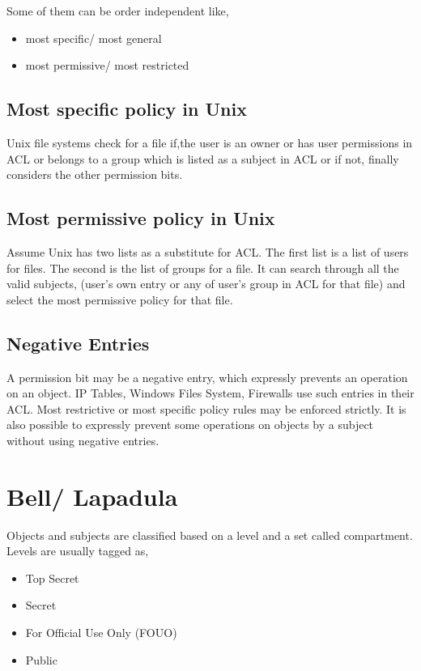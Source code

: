 \documentclass[11pt]{article} %
\begin{document}
Some of them can be order independent like,
\begin{itemize} \itemsep -2pt  %
\item most specific/ most general
\item most permissive/ most restricted
\end{itemize}

\subsection{Most specific policy in Unix}
Unix file systems check for a file if,the user is an owner or has user permissions in ACL
or belongs to a group which is listed as a subject in ACL or if not, finally considers the
other permission bits.

\subsection{Most permissive policy in Unix}
Assume Unix has two lists as a substitute for ACL. The first list is a list of users for
files. The second is the list of groups for a file. It can search through all the valid
subjects, (user's own entry or any of user's group in ACL for that file) and select the
most permissive policy for that file.

\subsection{Negative Entries}
A permission bit may be a negative entry, which expressly prevents an operation on an
object. IP Tables, Windows Files System, Firewalls use such entries in their ACL. Most
restrictive or most specific policy rules may be enforced strictly. It is also possible
to expressly prevent some operations on objects by a subject without using negative entries.

\section{Bell/ Lapadula}
Objects and subjects are classified based on a level and a set called compartment. Levels
are usually tagged as,

\begin{itemize} \itemsep -2pt  %
\item Top Secret
\item Secret
\item For Official Use Only (FOUO)
\item Public
\end{itemize}
\end{document}
